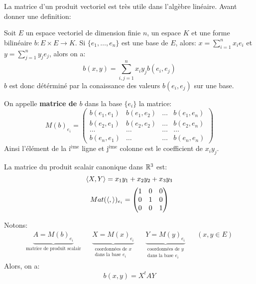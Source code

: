 La matrice d'un produit vectoriel est très utile dans l'algèbre linéaire. Avant donner une definition:
\par
Soit $E$ un espace vectoriel de dimension finie  $n$, un espace  $K$ et une forme bilinéaire  $b: E \times E \longrightarrow K$. Si $\{e_1, \ldots, e_n\}$ est une base de $E$, alors:  $x = \sum_{i=1}^{n} x_ie_i$ et $y = \sum_{j=1}^{n} y_je_j$, alors on a:
\[
b(x, y) = \sum_{i,j = 1}^{n} x_iy_jb(e_i, e_j)
\] 
$b$ est donc détérminé par la conaissance des valeurs  $b(e_i, e_j)$ sur une base.
 \begin{definition}
     On appelle  \textbf{matrice de $b$} dans la base $\{e_i\}$ la matrice:
      \[
          M(b)_{e_i} = \begin{pmatrix} 
              b(e_1, e_1) & b(e_1, e_2) & \ldots & b(e_1, e_n)\\
              b(e_2, e_1) & b(e_2, e_2) & \ldots & b(e_2, e_n)\\
              \ldots & \ldots & \ldots & \ldots\\
              b(e_n, e_1) & \ldots & \ldots & b(e_n, e_n)
          \end{pmatrix} 
     \] 
     Ainsi l'élément de la $\text{i}^{\text{ème}}$ ligne et $\text{j}^{\text{ème}}$ colonne est le coefficient de $x_iy_j$.
\end{definition}
\begin{eg}
   La matrice du produit scalair canonique dans $\mathbb{R}^3$ est:
   \[
       \langle X, Y \rangle = x_1y_1 + x_2y_2 + x_3y_3 
   \] 
   \[
       Mat(\langle , \rangle)_{e_i} = \begin{pmatrix} 
            1 & 0 & 0\\
            0 & 1 & 0\\
            0 & 0 & 1
       \end{pmatrix} 
   \] 
\end{eg}
\begin{prop}
   Notons:
   \begin{align*}
       \underbrace{A = M(b)_{e_i}}_{\text{matrice de produit scalair}} && \underbrace{X = M(x)_{e_i}}_{\substack{\text{coordonnées de $x$}\\ \text{dans la base  $e_i$}}} && \underbrace{Y = M(y)_{e_i}}_{\substack{\text{coordonnées de $y$}\\ \text{dans la base $e_i$}}} && (x, y \in E)
   \end{align*}
   Alors, on a:
   \[
       b(x, y) = X^{t}AY
   \] 
\end{prop}

